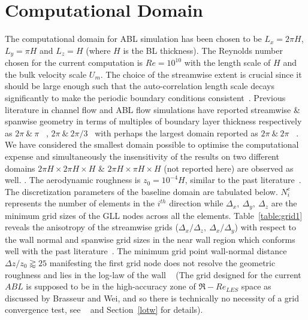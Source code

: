 \section{Computational Domain}
 The computational domain for ABL simulation has been chosen to be $L_x = 2\pi H$, $L_y = \pi H$ and $L_z = H$ ({where $H$ is the} BL thickness). The Reynolds number chosen for the current computation is $Re = 10^{10}$ with the length scale of $H$ and the bulk velocity scale $U_m$. The choice of the streamwise extent is crucial since it should be large enough such that the auto-correlation length scale decays significantly to make the periodic boundary conditions consistent~\cite{kimmoinmoser,pope,hoyas}. Previous literature in channel flow and ABL flow simulations have reported streamwise {\&}  spanwise geometry in terms of multiples of boundary layer thickness respectively as $2\pi \ \& \ \pi$ ~\cite{kimmoinmoser,porte1a,meyers2}, $2\pi \ \& \ 2\pi/3$~\cite{porte2a} with {perhaps the largest domain}  reported as $2\pi \ \& \ 2\pi$~\cite{porte1fun} . {We have considered the smallest domain possible to optimise the computational expense and simultaneously the insensitivity of the results on two different domains $2\pi H \times 2\pi H \times H$ \& $2\pi H \times \pi H \times H$  (not reported here) are observed as well.} . The aerodynamic roughness is $z_0 = 10^{-4}H$, similar to the past literature~\cite{porte2a,meyers2}. The discretization parameters of the {baseline domain} are tabulated below.  $N^{e}_i$ represents the number of elements in the $i^{th}$ direction while $\Delta_x, \ \Delta_y, \ \Delta_z$ are the minimum grid sizes of the GLL nodes {across all the elements}. Table~\ref{table:grid1}  reveals the anisotropy of the streamwise grids ($\Delta_x/\Delta_z, \ \Delta_x/{\Delta_y}$) with respect to the wall normal and spanwise grid {sizes} in the near wall region which conforms well with the past literature~\cite{pio2,meyers2}. {The minimum grid point wall-normal distance }$ \Delta z/z_0 \gtrapprox 25$ manifesting the first grid node does not resolve the geometric roughness and lies in the log-law of the wall ~\cite{meyers2} (The grid designed for the current $ABL$ is supposed to be in the high-accuracy zone of $\mathfrak{R}-{Re}_{LES}$ space as discussed by Brasseur and Wei, and so there is technically no necessity of a grid convergence test, see ~\cite{brass} and Section~\ref{lotw} for details). \\
